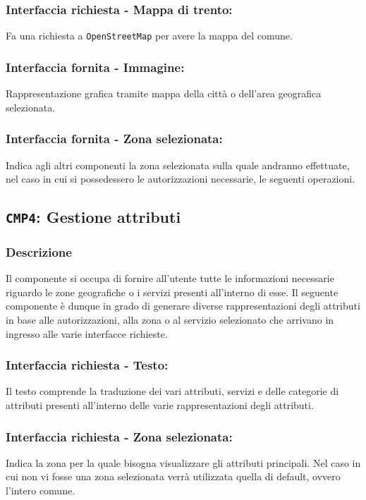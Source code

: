         \subsubsection{Interfaccia richiesta - Mappa di trento:}
            Fa una richiesta a \texttt{OpenStreetMap} per avere la mappa del comune.
        \subsubsection{Interfaccia fornita - Immagine:}
            Rappresentazione grafica tramite mappa della città o dell'area geografica selezionata.
        \subsubsection{Interfaccia fornita - Zona selezionata:}
            Indica agli altri componenti la zona selezionata sulla quale andranno effettuate, nel caso in cui si possedessero le autorizzazioni necessarie, le seguenti operazioni.
    
    \subsection{\texttt{CMP4}: Gestione attributi}
        \subsubsection{Descrizione}
            Il componente si occupa di fornire all'utente tutte le informazioni necessarie riguardo le zone geografiche o i servizi presenti all'interno di esse. Il seguente componente è dunque in grado di generare diverse rappresentazioni degli attributi in base alle autorizzazioni, alla zona o al servizio selezionato che arrivano in ingresso alle varie interfacce richieste.
        \subsubsection{Interfaccia richiesta - Testo:}
            Il testo comprende la traduzione dei vari attributi, servizi e delle categorie di attributi presenti all'interno delle varie rappresentazioni degli attributi.
        \subsubsection{Interfaccia richiesta - Zona selezionata:}
            Indica la zona per la quale bisogna visualizzare gli attributi principali. Nel caso in cui non vi fosse una zona selezionata verrà utilizzata quella di default, ovvero l'intero comune.
